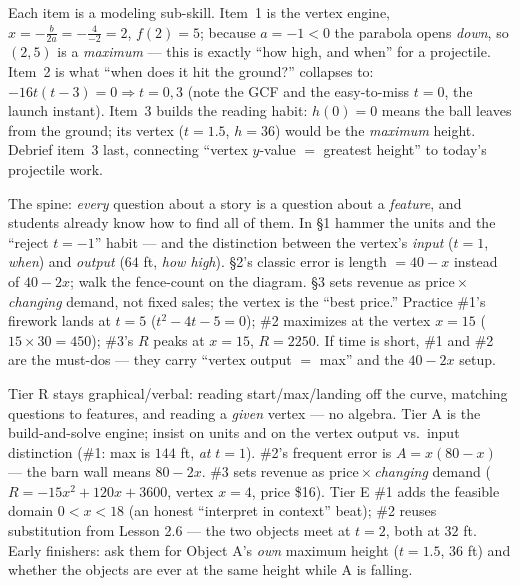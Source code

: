 \documentclass[10pt]{article}
\begin{document}
\begin{teachernote}[Warm-Up]
Each item is a modeling sub-skill. Item~1 is the vertex engine, $x=-\frac{b}{2a}=-\frac{4}{-2}=2$, $f(2)=5$; because
$a=-1<0$ the parabola opens \emph{down}, so $(2,5)$ is a \emph{maximum} --- this is exactly ``how high, and when'' for
a projectile. Item~2 is what ``when does it hit the ground?'' collapses to: $-16t(t-3)=0\Rightarrow t=0,3$ (note the
GCF and the easy-to-miss $t=0$, the launch instant). Item~3 builds the reading habit: $h(0)=0$ means the ball leaves
from the ground; its vertex ($t=1.5$, $h=36$) would be the \emph{maximum} height. Debrief item~3 last, connecting
``vertex $y$-value $=$ greatest height'' to today's projectile work.
\end{teachernote}

\begin{teachernote}
The spine: \emph{every} question about a story is a question about a \emph{feature}, and students already know how to
find all of them. In \S1 hammer the units and the ``reject $t=-1$'' habit --- and the distinction between the vertex's
\emph{input} ($t=1$, \emph{when}) and \emph{output} ($64$ ft, \emph{how high}). \S2's classic error is length $=40-x$
instead of $40-2x$; walk the fence-count on the diagram. \S3 sets revenue as price\,$\times$\,\emph{changing} demand,
not fixed sales; the vertex is the ``best price.'' Practice \#1's firework lands at $t=5$ ($t^2-4t-5=0$); \#2 maximizes
at the vertex $x=15$ ($15\times30=450$); \#3's $R$ peaks at $x=15$, $R=2250$. If time is short, \#1 and \#2 are the
must-dos --- they carry ``vertex output $=$ max'' and the $40-2x$ setup.
\end{teachernote}

\begin{teachernote}
Tier R stays graphical/verbal: reading start/max/landing off the curve, matching questions to features, and reading a
\emph{given} vertex --- no algebra. Tier A is the build-and-solve engine; insist on units and on the vertex output vs.\
input distinction (\#1: max is $144$ ft, \emph{at} $t=1$). \#2's frequent error is $A=x(80-x)$ --- the barn wall means
$80-2x$. \#3 sets revenue as price\,$\times$\,\emph{changing} demand ($R=-15x^2+120x+3600$, vertex $x=4$, price \$16).
Tier E \#1 adds the feasible domain $0<x<18$ (an honest ``interpret in context'' beat); \#2 reuses substitution from
Lesson 2.6 --- the two objects meet at $t=2$, both at $32$ ft. Early finishers: ask them for Object A's \emph{own}
maximum height ($t=1.5$, $36$ ft) and whether the objects are ever at the same height while A is falling.
\end{teachernote}
\end{document}

